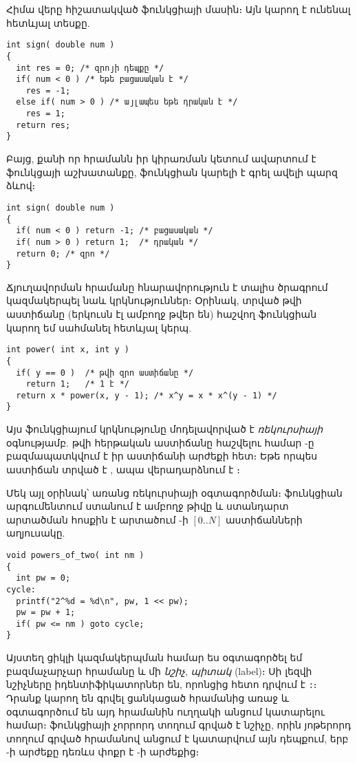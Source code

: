 Հիմա վերը հիշատակված  ֆունկցիայի մասին։ Այն կարող է ունենալ
հետևյալ տեսքը.

\begin{Verbatim}
int sign( double num )
{
  int res = 0; /* զրոյի դեպքը */
  if( num < 0 ) /* եթե բացասական է */
    res = -1;
  else if( num > 0 ) /* այլապես եթե դրական է */
    res = 1;
  return res;
}
\end{Verbatim}

Բայց, քանի որ  հրամանն իր կիրառման կետում ավարտում
է ֆունկցայի աշխատանքը,  ֆունկցիան կարելի է գրել ավելի
պարզ ձևով։

\begin{Verbatim}
int sign( double num )
{
  if( num < 0 ) return -1; /* բացասական */
  if( num > 0 ) return 1;  /* դրական */
  return 0; /* զրո */
}
\end{Verbatim}

Ճյուղավորման հրամանը հնարավորություն է տալիս ծրագրում կազմակերպել
նաև կրկնություններ։ Օրինակ, տրված  թվի  աստիճանը
(երկուսն էլ ամբողջ թվեր են) հաշվող ֆունկցիան կարող եմ սահմանել
հետևյալ կերպ.

\begin{Verbatim}
int power( int x, int y )
{
  if( y == 0 )  /* թվի զրո աստիճանը */
    return 1;   /* 1 է */
  return x * power(x, y - 1); /* x^y = x * x^(y - 1) */
}
\end{Verbatim}

Այս ֆունկցիայում կրկնությունը մոդելավորված է \emph{ռեկուրսիայի}
 օգնությամբ.  թվի հերթական 
աստիճանը հաշվելու համար -ը բազմապատկվում է իր 
աստիճանի արժեքի հետ։ Եթե որպես աստիճան տրված է , ապա
վերադարձնում է ։

Մեկ այլ օրինակ՝ առանց ռեկուրսիայի օգտագործման։ 
ֆունկցիան արգումենտում ստանում է  ամբողջ թիվը և ստանդարտ
արտածման հոսքին է արտածում -ի \([0..N]\) աստիճանների աղյուսակը.

\begin{Verbatim}
void powers_of_two( int nm )
{
  int pw = 0;
cycle:
  printf("2^%d = %d\n", pw, 1 << pw);
  pw = pw + 1;
  if( pw <= nm ) goto cycle;
}
\end{Verbatim}

Այստեղ ցիկլի կազմակերպման համար ես օգտագործել եմ բազմաչարչար 
 հրամանը և մի \emph{նշիչ}, \emph{պիտակ} (label)։ Սի լեզվի
նշիչները իդենտիֆիկատորներ են, որոնցից հետո դրվում է \verb|:|։ Դրանք կարող
են գրվել ցանկացած հրամանից առաջ և օգտագործում են այդ հրամանին ուղղակի անցում
կատարելու համար։  ֆունկցիայի չորրորդ տողում գրված
է  նշիչը, որին յոթերորդ տողում գրված  հրամանով
անցում է կատարվում այն դեպքում, երբ -ի արժեքը դեռևս փոքր է
-ի արժեքից։

